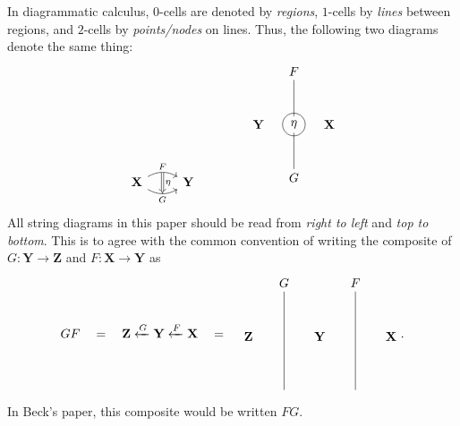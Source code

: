 \documentclass{article}
\numberwithin{equation}{section}
\theoremstyle{definition}
\newcommand{\varcat}[1]{\mathbf{#1}}
\newcommand{\cX}{\varcat{X}}
\newcommand{\cY}{\varcat{Y}}
\newcommand{\cZ}{\varcat{Z}}
\begin{document}
	In diagrammatic calculus, $0$-cells are denoted by \emph{regions}, $1$-cells by \emph{lines} between regions, and $2$-cells by \emph{points/nodes} on lines. Thus, the following two diagrams denote the same thing:
	\begin{equation*}
		\begin{aligned}
			\begin{tikzcd}
				\cX 
					\arrow[r, bend left, "F"{name=U}]
					\arrow[r, bend right, "G"{name=D, below}]
				& \cY
					\arrow[Rightarrow, "\eta", from=U, to=D]
			\end{tikzcd}
			\qquad
			\qquad
			\begin{tikzpicture}
				\path (0.5,0) node {$\cX$};
				\path (-1.5,0) node {$\cY$};
				\path (-0.5,1.5) node (F) {$F$};
				\path (-0.5,-1.5) node (G) {$G$};
				\path (-0.5,0) node (e) {$\eta$};
				
				\draw[black]
					(F) to (e) to (G);
					
				\draw [black] (-0.5,0) circle [radius=0.32];
			\end{tikzpicture}
		\end{aligned}
	\end{equation*}
	All string diagrams in this paper should be read from \emph{right to left} and \emph{top to bottom}. This is to agree with the common convention of writing the composite of $G:\cY \to \cZ$ and $F: \cX \to \cY$ as
	\begin{equation*}
		GF \quad = \quad \cZ \xleftarrow{G} \cY \xleftarrow{F} \cX \quad = \quad
		\begin{aligned}
			\begin{tikzpicture}
				\node at (0,0) (G) {$G$};
				\node at (2,0) (F) {$F$};

				\node at (-1,-1.5) {$\cZ$};
				\node at (1,-1.5) {$\cY$};
				\node at (3,-1.5) {$\cX$};

				\draw
				(G) -- (0,-3);
				\draw
				(F) -- (2,-3);
			\end{tikzpicture}
		\end{aligned}.
	\end{equation*}	
	In Beck's paper, this composite would be written $FG$.
\end{document}
